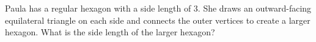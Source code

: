 Paula has a regular hexagon with a side length of $3$. She draws an outward-facing equilateral triangle on each side and connects the outer vertices to create a larger hexagon. What is the side length of the larger hexagon?
